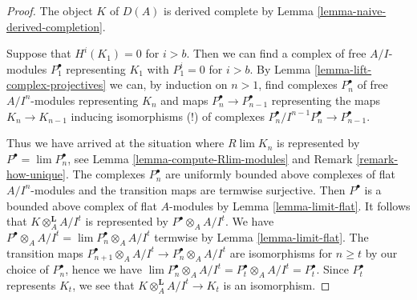 \documentclass[10pt,a4paper]{amsart}
\theoremstyle{plain}
\theoremstyle{definition}
\theoremstyle{remark}
\numberwithin{equation}{subsection}
\def\lim{\mathop{\mathrm{lim}}\nolimits}
\begin{document}
\begin{proof}
The object $K$ of $D(A)$ is derived complete by
Lemma \ref{lemma-naive-derived-completion}.

\medskip\noindent
Suppose that $H^i(K_1) = 0$ for $i > b$. Then we can find a complex of
free $A/I$-modules $P_1^\bullet$ representing $K_1$ with $P_1^i = 0$
for $i > b$. By Lemma \ref{lemma-lift-complex-projectives}
we can, by induction on $n > 1$, find
complexes $P_n^\bullet$ of free $A/I^n$-modules representing $K_n$
and maps $P_n^\bullet \to P_{n - 1}^\bullet$ representing the maps
$K_n \to K_{n - 1}$ inducing isomorphisms (!)
of complexes $P_n^\bullet/I^{n - 1}P_n^\bullet \to P_{n - 1}^\bullet$.

\medskip\noindent
Thus we have arrived at the situation where $R\lim K_n$ is represented by
$P^\bullet = \lim P_n^\bullet$, see
Lemma \ref{lemma-compute-Rlim-modules} and
Remark \ref{remark-how-unique}.
The complexes $P_n^\bullet$ are uniformly bounded above complexes
of flat $A/I^n$-modules and the transition maps are termwise surjective.
Then $P^\bullet$ is a bounded above complex of flat $A$-modules by
Lemma \ref{lemma-limit-flat}.
It follows that $K \otimes_A^\mathbf{L} A/I^t$ is represented by
$P^\bullet \otimes_A A/I^t$. We have
$P^\bullet \otimes_A A/I^t = \lim P_n^\bullet \otimes_A A/I^t$
termwise by Lemma \ref{lemma-limit-flat}. The transition maps
$P_{n + 1}^\bullet \otimes_A A/I^t \to P_n^\bullet \otimes_A A/I^t$
are isomorphisms for $n \geq t$ by our choice of $P_n^\bullet$, hence we have
$\lim P_n^\bullet \otimes_A A/I^t = P_t^\bullet \otimes_A A/I^t = P_t^\bullet$.
Since $P_t^\bullet$ represents $K_t$, we see that
$K \otimes_A^\mathbf{L} A/I^t \to K_t$ is an isomorphism.
\end{proof}
\end{document}
